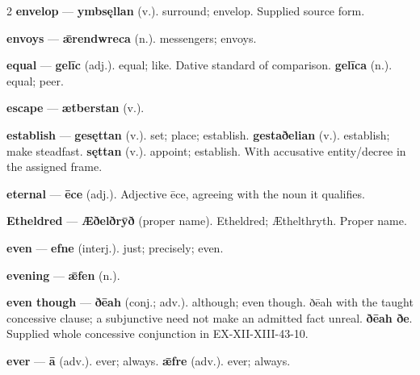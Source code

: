 \begin{multicols}{2}
\textbf{envelop} — \textbf{ymbsęllan} (v.). surround; envelop. Supplied source form.\par
\textbf{envoys} — \textbf{ǣrendwreca} (n.). messengers; envoys.\par
\textbf{equal} — \textbf{gelīc} (adj.). equal; like. Dative standard of comparison. \textbf{gelīca} (n.). equal; peer.\par
\textbf{escape} — \textbf{ætberstan} (v.).\par
\textbf{establish} — \textbf{gesęttan} (v.). set; place; establish. \textbf{gestaðelian} (v.). establish; make steadfast. \textbf{sęttan} (v.). appoint; establish. With accusative entity/decree in the assigned frame.\par
\textbf{eternal} — \textbf{ēce} (adj.). Adjective ēce, agreeing with the noun it qualifies.\par
\textbf{Etheldred} — \textbf{Æðelðrȳð} (proper name). Etheldred; Æthelthryth. Proper name.\par
\textbf{even} — \textbf{efne} (interj.). just; precisely; even.\par
\textbf{evening} — \textbf{ǣfen} (n.).\par
\textbf{even though} — \textbf{ðēah} (conj.; adv.). although; even though. ðēah with the taught concessive clause; a subjunctive need not make an admitted fact unreal. \textbf{ðēah ðe}. Supplied whole concessive conjunction in EX-XII-XIII-43-10.\par
\textbf{ever} — \textbf{ā} (adv.). ever; always. \textbf{ǣfre} (adv.). ever; always.\par

\end{multicols}
